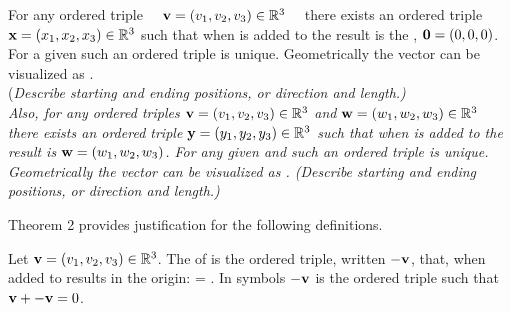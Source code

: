 \begin{theorem}
 	For any ordered triple \ \  $\mathbf{v}=({v_1},{v_2},{v_3}) \in \mathbb{R}^{3}$ \ \ there exists an  ordered triple $\mathbf{x}=({x_1},{x_2},{x_3}) \in \mathbb{R}^{3}$  such that when   is added to  the result is the , $\mathbf{0}=({0},{0},{0})$. For a given  such an ordered triple is unique. Geometrically the vector  can be visualized as \underline{\hspace{.5in} }. \\
 	(\it{Describe starting and ending positions, or direction and length.}) \vspace{.2 cm}  
 	\\ 	
 	Also, for any ordered triples $\mathbf{v}=({v_1},{v_2},{v_3}) \in \mathbb{R}^{3}$ and $\mathbf{w}=({w_1},{w_2},{w_3}) \in \mathbb{R}^{3}$ there exists an ordered triple $\mathbf{y}=({y_1},{y_2},{y_3}) \in \mathbb{R}^{3}$  such that when   is added to  the result is $\mathbf{w}=({w_1},{w_2},{w_3})$. For any given  and   such an ordered triple is unique. Geometrically the vector  can be visualized as \underline{\hspace{.5in}  }. (\it{Describe starting and ending positions, or direction and length.}) 
\end{theorem}
\vspace{-.3in}\hspace{5in}\begin{annotation}
 	\vspace{.2cm} 
\end{annotation}

 Theorem 2 provides justification for the following definitions.

 	
 \begin{defn}
 	Let $\mathbf{v}=({v_1},{v_2},{v_3}) \in \mathbb{R}^3$. The  of  is the ordered triple, written $-\mathbf{v}$, that, when added to  results in the origin:  = . In symbols $-\mathbf{v}$ is the ordered triple such that $\mathbf{v} + -\mathbf{v}=0$.
 \end{defn}
 
